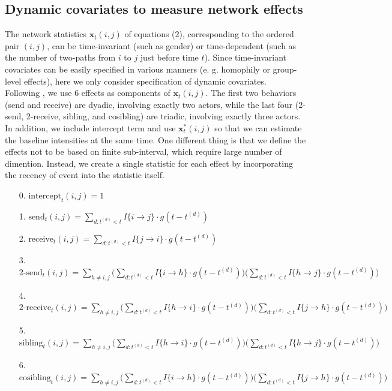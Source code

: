 \documentclass[a4paper]{article}
\begin{document}
\subsection{Dynamic covariates to measure network effects}
The network statistics $\boldsymbol{x}_t(i, j)$ of equations (2), corresponding to the ordered pair $(i, j)$, can be time-invariant (such as gender) or time-dependent (such as the number of two-paths from $i$ to $j$ just before time $t$). Since time-invariant covariates can be easily specified in various manners (e. g. homophily or group-level effects), here we only consider specification of dynamic covariates.\\ \newline
Following \cite{PerryWolfe2012}, we use 6 effects as components of $\boldsymbol{x}_t(i, j)$. The first two behaviors (send and receive) are dyadic, involving exactly two actors,
while the last four (2-send, 2-receive, sibling, and cosibling) are triadic, involving exactly three actors.  In addition, we include intercept term and use $\boldsymbol{x}^*_t(i, j)$ so that we can estimate the baseline intensities at the same time. One different thing is that we define the effects not to be based on finite sub-interval, which require large number of dimention. Instead, we create a single statistic for each effect by incorporating the recency of event into the statistic itself. 
\begin{itemize}[leftmargin=*,rightmargin=-1cm ]
\item [0.] $\mbox{intercept}_t(i, j) = 1$
\item [1.]  $\mbox{send}_t(i, j)=\sum\limits_{d: t^{(d)}<t} I\{i\rightarrow j\}\cdot g(t-t^{(d)})$
\item [2.] $\mbox{receive}_t(i, j)=\sum\limits_{d: t^{(d)}<t} I\{j\rightarrow i\}\cdot g(t-t^{(d)})$
\item [3.] $\mbox{2-send}_t(i, j)=\sum\limits_{h \neq i, j}\Big(\sum\limits_{d: t^{(d)}<t}  I\{i\rightarrow h\}\cdot g(t-t^{(d)})\Big)\Big(\sum\limits_{d: t^{(d)}<t} I\{h\rightarrow j\}\cdot g(t-t^{(d)})\Big)$
\item [4.]  $\mbox{2-receive}_t(i, j)=\sum\limits_{h \neq i, j}\Big(\sum\limits_{d: t^{(d)}<t} I\{h\rightarrow i\}\cdot g(t-t^{(d)})\Big)\Big(\sum\limits_{d: t^{(d)}<t} I\{j\rightarrow h\}\cdot g(t-t^{(d)})\Big)$
\item [5.] $\mbox{sibling}_t(i, j)=\sum\limits_{h \neq i, j}\Big(\sum\limits_{d: t^{(d)}<t} I\{h\rightarrow i\}\cdot g(t-t^{(d)})\Big)\Big(\sum\limits_{d: t^{(d)}<t} I\{h\rightarrow j\}\cdot g(t-t^{(d)})\Big)$
\item [6.] $\mbox{cosibling}_t(i, j)=\sum\limits_{h \neq i, j}\Big(\sum\limits_{d: t^{(d)}<t} I\{i\rightarrow h\}\cdot g(t-t^{(d)})\Big)\Big(\sum\limits_{d: t^{(d)}<t} I\{j\rightarrow h\}\cdot g(t-t^{(d)})\Big)$
\end{itemize}
\end{document}
